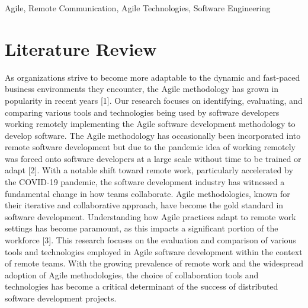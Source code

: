 \documentclass[conference]{IEEEtran}
\begin{document}


\begin{IEEEkeywords}
Agile, Remote Communication, Agile Technologies, Software Engineering
\end{IEEEkeywords}

\section{Literature Review}
As organizations strive to become more adaptable to the dynamic and fast-paced business environments they encounter, the Agile methodology has grown in popularity in recent years [1]. Our research focuses on identifying, evaluating, and comparing various tools and technologies being used by software developers working remotely implementing the Agile software development methodology to develop software. The Agile methodology has occasionally been incorporated into remote software development but due to the pandemic idea of working remotely was forced onto software developers at a large scale without time to be trained or adapt [2]. With a notable shift toward remote work, particularly accelerated by the COVID-19 pandemic, the software development industry has witnessed a fundamental change in how teams collaborate. Agile methodologies, known for their iterative and collaborative approach, have become the gold standard in software development. Understanding how Agile practices adapt to remote work settings has become paramount, as this impacts a significant portion of the workforce [3]. This research focuses on the evaluation and comparison of various tools and technologies employed in Agile software development within the context of remote teams. With the growing prevalence of remote work and the widespread adoption of Agile methodologies, the choice of collaboration tools and technologies has become a critical determinant of the success of distributed software development projects.
\end{document}
